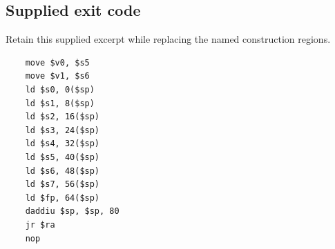 \subsection*{Supplied exit code}
Retain this supplied excerpt while replacing the named construction regions.
\begin{verbatim}
    move $v0, $s5
    move $v1, $s6
    ld $s0, 0($sp)
    ld $s1, 8($sp)
    ld $s2, 16($sp)
    ld $s3, 24($sp)
    ld $s4, 32($sp)
    ld $s5, 40($sp)
    ld $s6, 48($sp)
    ld $s7, 56($sp)
    ld $fp, 64($sp)
    daddiu $sp, $sp, 80
    jr $ra
    nop
\end{verbatim}
